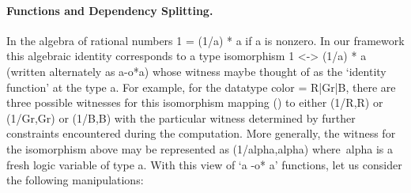 \documentclass[preprint]{sigplanconf}
\begin{document}
\paragraph*{Functions and Dependency Splitting.} 


In the algebra of rational numbers {{1 = (1/a) * a}} if {{a}} is
nonzero.  In our framework this algebraic identity corresponds to a
type isomorphism {{1 <-> (1/a) * a}} (written alternately as
{{a-o*a}}) whose witness maybe thought of as the `identity function'
at the type {{a}}.  For example, for the datatype {{color = R|Gr|B}},
there are three possible witnesses for this isomorphism mapping {{()}}
to either {{(1/R,R)}} or {{(1/Gr,Gr)}} or {{(1/B,B)}} with the
particular witness determined by further constraints encountered
during the computation. More generally, the witness for the
isomorphism above may be represented as {{(1/alpha,alpha)}}
where~{{alpha}} is a fresh logic variable of type {{a}}. With this
view of `{{a -o* a}}' functions, let us consider the following
manipulations:

\end{document}
